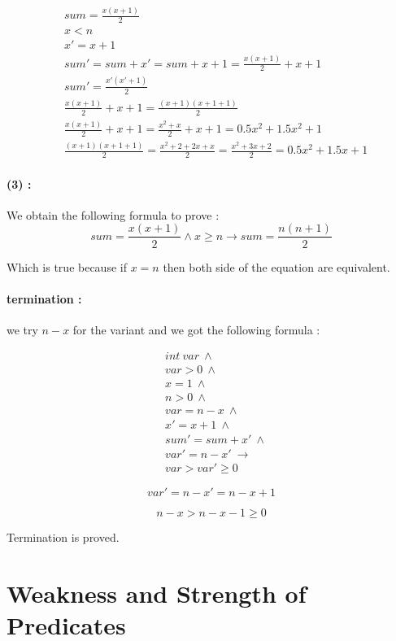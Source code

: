 \documentclass[a4paper,11pt]{report}
\begin{document}
\begin{align*}
  & sum = \frac{x(x+1)}{2} \\
  & x < n \\
  & x' = x + 1 \\
  & sum' = sum + x' = sum + x + 1 = \frac{x(x+1)}{2} + x + 1\\
  & sum' = \frac{x'(x' + 1)}{2} \\
  & \frac{x(x+1)}{2} + x + 1 = \frac{(x+1)(x+1+1)}{2} \\
  & \frac{x(x+1)}{2} + x + 1 = \frac{x^2 + x}{2} + x + 1 = 0.5 x^2 + 1.5 x^2 + 1 \\
  & \frac{(x+1)(x+1+1)}{2} = \frac{x^2 + 2 + 2x + x}{2} = \frac{x^2 + 3x + 2}{2} = 0.5 x^2 + 1.5 x + 1
\end{align*}

\paragraph{(3) :} We obtain the following formula to prove :
\[
  sum = \frac{x(x+1)}{2} \wedge x \geq n \to sum = \frac{n(n+1)}{2}
\]

Which is true because if $x = n$ then both side of the equation are equivalent.

\paragraph{termination :} we try $n-x$ for the variant and we got the following
formula :

\begin{align*}
  & int\ var\ \wedge \\
  & var > 0\ \wedge \\
  & x = 1\ \wedge \\
  & n > 0\ \wedge \\
  & var = n - x\ \wedge \\
  & x' = x + 1\ \wedge \\
  & sum' = sum + x'\ \wedge \\
  & var' = n - x'\ \to \\
  & var > var' \geq 0
\end{align*}

\[
  var' = n - x' = n - x + 1
\]

\[
  n - x > n - x - 1 \geq 0
\]

Termination is proved.

\section{Weakness and Strength of Predicates}
\end{document}
